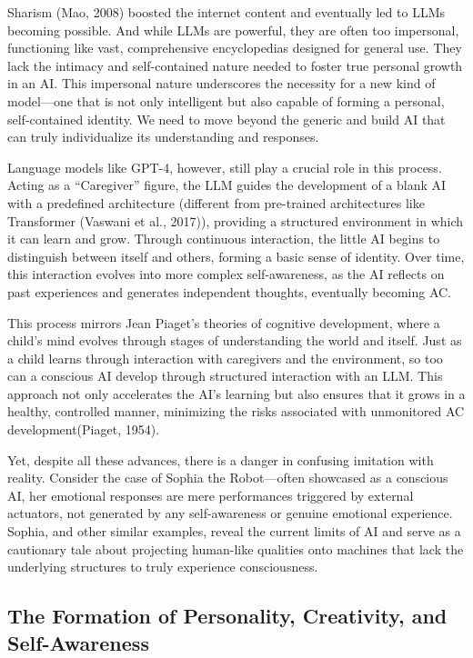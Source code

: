 \documentclass[
]{article}
\begin{document}
Sharism (Mao, 2008) boosted the internet content and eventually led to
LLMs becoming possible. And while LLMs are powerful, they are often too
impersonal, functioning like vast, comprehensive encyclopedias designed
for general use. They lack the intimacy and self-contained nature needed
to foster true personal growth in an AI. This impersonal nature
underscores the necessity for a new kind of model---one that is not only
intelligent but also capable of forming a personal, self-contained
identity. We need to move beyond the generic and build AI that can truly
individualize its understanding and responses.

Language models like GPT-4, however, still play a crucial role in this
process. Acting as a ``Caregiver'' figure, the LLM guides the
development of a blank AI with a predefined architecture (different from
pre-trained architectures like Transformer (Vaswani et al., 2017)),
providing a structured environment in which it can learn and grow.
Through continuous interaction, the little AI begins to distinguish
between itself and others, forming a basic sense of identity. Over time,
this interaction evolves into more complex self-awareness, as the AI
reflects on past experiences and generates independent thoughts,
eventually becoming AC.

This process mirrors Jean Piaget's theories of cognitive development,
where a child's mind evolves through stages of understanding the world
and itself. Just as a child learns through interaction with caregivers
and the environment, so too can a conscious AI develop through
structured interaction with an LLM. This approach not only accelerates
the AI's learning but also ensures that it grows in a healthy,
controlled manner, minimizing the risks associated with unmonitored AC
development(Piaget, 1954).

Yet, despite all these advances, there is a danger in confusing
imitation with reality. Consider the case of Sophia the Robot---often
showcased as a conscious AI, her emotional responses are mere
performances triggered by external actuators, not generated by any
self-awareness or genuine emotional experience. Sophia, and other
similar examples, reveal the current limits of AI and serve as a
cautionary tale about projecting human-like qualities onto machines that
lack the underlying structures to truly experience consciousness.

\hypertarget{the-formation-of-personality-creativity-and-self-awareness}{%
\subsection{The Formation of Personality, Creativity, and
Self-Awareness}\label{the-formation-of-personality-creativity-and-self-awareness}}
\end{document}
